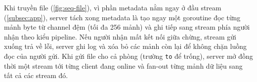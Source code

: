 Khi truyền file (\cref{fig:seq-file}), vì phần metadata nằm ngay ở đầu stream (\cref{subsec:app}), server tách xong
metadata là tạo ngay một goroutine  đọc từng mảnh byte từ channel đệm (tối đa 256 mảnh) và ghi
tiếp sang stream phía người nhận theo kiểu pipeline. Nếu người nhận mất kết nối giữa chừng, stream gửi
xuống trả về lỗi, server ghi log và xóa bỏ các mảnh còn lại để không chặn luồng đọc của người gửi. Khi gửi file cho
cả phòng (trường \texttt{to} để trống), server mở đồng thời một stream tới từng client đang online và fan-out từng
mảnh dữ liệu sang tất cả các stream đó.
